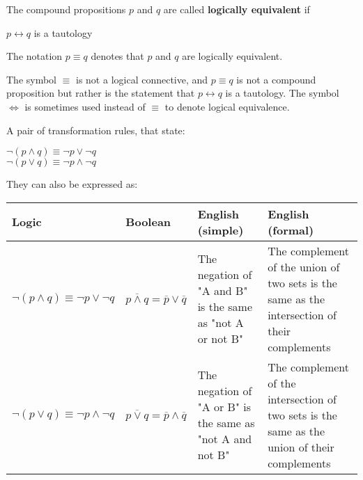 \vspace{5pt}
\begin{tcolorbox}[title=Definition: Logically Equivalent]
The compound propositions $p$ and $q$ are called \textbf{logically equivalent} if 
\begin{center}
$p\leftrightarrow q$ is a tautology
\end{center}
The notation $p\equiv q $ denotes that $p$ and $q$ are logically equivalent.
\end{tcolorbox}
\begin{tcolorbox}[colback=white, colframe=gray!60, title=Remark 1]
The symbol $\equiv$ is not a logical connective, and $p\equiv q$ is not a compound proposition
but rather is the statement that $p\leftrightarrow q$ is a tautology. The symbol $\Leftrightarrow$ is sometimes used instead
of $\equiv$ to denote logical equivalence.
\end{tcolorbox}
\begin{tcolorbox}[title=Definition: De Morgan’s Laws]
A pair of transformation rules, that state:
\begin{center}
$\neg (p\land q) \equiv \neg p \lor \neg q$ \\
$\neg (p\lor q) \equiv \neg p \land \neg q$
\end{center}

They can also be expressed as:

\begin{center}
\begin{tabular}{|
    >{\centering\arraybackslash}m{3cm}  %
    |>{\centering\arraybackslash}m{2.5cm}  %
    |m{3.5cm}  %
    |m{3.5cm}|}  %
\hline
\rowcolor{gray!20}
\textbf{Logic} & \textbf{Boolean} & \textbf{English (simple)} & \textbf{English (formal)} \\
\hline
$\neg (p\land q) \equiv \neg p \lor \neg q$ & 
$\overline{p \land q} = \overline{p} \lor \overline{q}$  & The negation of "A and B" is the same as "not A or not B" & The complement of the union of two sets is the same as the intersection of their complements \\
\hline
$\neg (p\lor q) \equiv \neg p \land \neg q$ & $\overline{p \lor q} = \overline{p} \land \overline{q}$ & The negation of "A or B" is the same as "not A and not B" & The complement of the intersection of two sets is the same as the union of their complements\\
\hline  
\end{tabular}
\end{center}
\end{tcolorbox}

